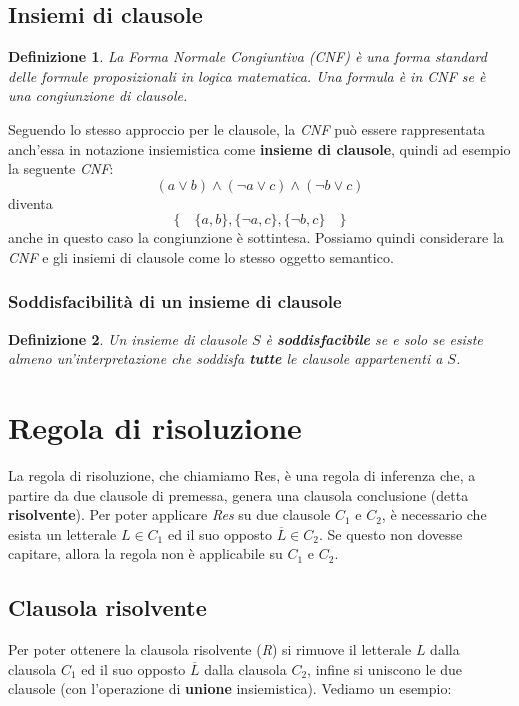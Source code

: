 \documentclass[a4paper,12pt]{report}
\newtheorem{definition}{Definizione}[section]
\begin{document}
\subsection{Insiemi di clausole}
\begin{definition}
    La Forma Normale Congiuntiva (CNF) è una forma standard delle formule proposizionali in logica matematica. Una formula è in CNF se è una congiunzione di clausole.
\end{definition}
Seguendo lo stesso approccio per le clausole, la \emph{CNF} può essere rappresentata anch'essa in notazione insiemistica come \textbf{insieme di clausole}, quindi ad esempio la seguente \emph{CNF}:
\[ (a \lor b) \land (\lnot a \lor c) \land (\lnot b \lor c) \]
diventa
\[\{ \quad \{a, b\}, \{\lnot a, c\}, \{\lnot b, c\} \quad \}\]
anche in questo caso la congiunzione è sottintesa. Possiamo quindi considerare la \emph{CNF} e gli insiemi di clausole come lo stesso oggetto semantico.

\subsubsection{Soddisfacibilità di un insieme di clausole}
\begin{definition}
    Un insieme di clausole $S$ è \textbf{soddisfacibile} se e solo se esiste almeno un'interpretazione che soddisfa \textbf{tutte} le clausole appartenenti a $S$.
\end{definition}

\section{Regola di risoluzione}
\label{Res}
La regola di risoluzione, che chiamiamo Res, è una regola di inferenza che, a partire da due clausole di premessa, genera una clausola conclusione (detta \textbf{risolvente}). Per poter applicare \emph{Res} su due clausole $C_1$ e $C_2$, è necessario che esista un letterale $L \in C_1$ ed il suo opposto $\overline{L} \in C_2$. Se questo non dovesse capitare, allora la regola non è applicabile su $C_1$ e $C_2$.

\subsection{Clausola risolvente}
Per poter ottenere la clausola risolvente (\emph{R}) si rimuove il letterale $L$ dalla clausola $C_1$ ed il suo opposto $\overline{L}$ dalla clausola $C_2$, infine si uniscono le due clausole (con l'operazione di \textbf{unione} insiemistica). Vediamo un esempio:
\end{document}
